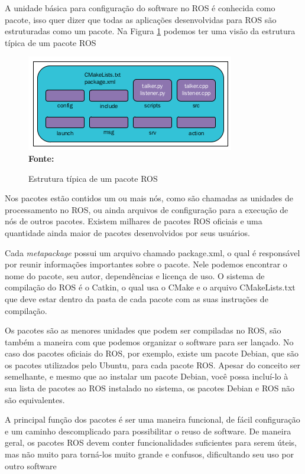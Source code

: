 A unidade básica para configuração do software no ROS é conhecida como pacote, isso quer dizer que todas as aplicações desenvolvidas para ROS são estruturadas como um pacote. Na Figura \ref{fig:rospacotestrut} podemos ter uma visão da estrutura típica de um pacote ROS

\begin{figure}[ht]
	\caption{Estrutura típica de um pacote ROS}
	\begin{center}
		\includegraphics[scale=0.8]{imagens/rospackagestruture.png}\\
		{\small \textbf{Fonte:} }
    \end{center}\label{fig:rospacotestrut}
\end{figure}

Nos pacotes estão contidos um ou mais nós, como são chamadas as unidades de processamento no ROS, ou ainda arquivos de configuração para a execução de nós de outros pacotes. Existem milhares de pacotes ROS oficiais e uma quantidade ainda maior de pacotes desenvolvidos por seus usuários. 

Cada \textit{metapackage} possui um arquivo chamado package.xml, o qual é responsável por reunir informações importantes sobre o pacote. Nele podemos encontrar o nome do pacote, seu autor, dependências e licença de uso. O sistema de compilação do ROS é o Catkin, o qual usa o CMake e o arquivo CMakeLists.txt que deve estar dentro da pasta de cada pacote com as suas instruções de compilação. 

Os pacotes são as menores unidades que podem ser compiladas no ROS, são também  a maneira com que podemos organizar o software para ser lançado. No caso dos pacotes oficiais do ROS, por exemplo, existe um pacote Debian, que são os pacotes utilizados pelo Ubuntu, para cada pacote ROS. Apesar do conceito ser semelhante, e mesmo que ao instalar um pacote Debian, você possa incluí-lo à sua lista de pacotes ao ROS instalado no sistema, os pacotes Debian e ROS não são equivalentes. 

A principal função dos pacotes é ser uma maneira funcional, de fácil configuração e um caminho descomplicado para possibilitar o reuso de software. De maneira geral, os pacotes ROS devem conter funcionalidades suficientes para serem úteis, mas não muito para torná-los muito grande e confusos, dificultando seu uso por outro software 


